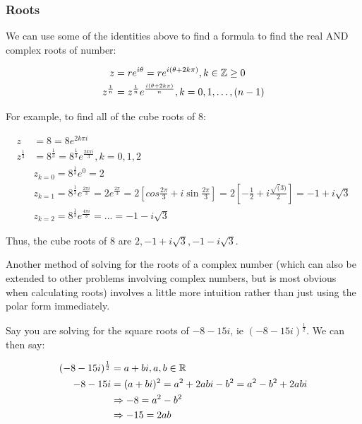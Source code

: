 \documentclass[12pt]{article}
\begin{document}
\subsubsection{Roots}

We can use some of the identities above to find a formula to find the real AND complex roots of number:

\begin{equation}
    \begin{split}
        z &= r e^{i \theta} = re^{i(\theta +2k\pi)}, k \in \mathbb{Z} \ge 0\\
        z^{\frac{1}{n}} &= z^{\frac{1}{n}}e^{\frac{i (\theta + 2k\pi)}{n}}, k = 0,1,\dots,(n-1)\\
    \end{split}
\end{equation}

For example, to find all of the cube roots of 8:

\begin{equation}
    \begin{split}
        z &= 8 = 8e^{2k\pi i}\\
        z^{\frac{1}{3}} &= 8^{\frac{1}{3}} = 8^{\frac{1}{3}}e^{\frac{2k\pi i}{3}}, k = 0,1,2\\
        &z_{k=0} = 8^{\frac{1}{3}}e^{0} = 2\\
        &z_{k=1} = 8^{\frac{1}{3}}e^{\frac{2\pi i}{3}} = 2e^{\frac{2\pi}{3}}=2[cos\frac{2\pi}{3}+i\sin\frac{2\pi}{3}] = 2[-\frac{1}{2}+i\frac{\sqrt(3)}{2}] = -1 + i \sqrt{3}\\
        &z_{k=2} = 8^{\frac{1}{3}}e^{\frac{4\pi i}{3}} = ... = -1 - i \sqrt{3}
    \end{split}
\end{equation}

Thus, the cube roots of 8 are $2, -1 + i\sqrt{3}, -1 - i\sqrt{3}$.

Another method of solving for the roots of a complex number (which can also be extended to other problems involving complex numbers, but is most obvious when calculating roots) involves a little more intuition rather than just using the polar form immediately. 

Say you are solving for the square roots of $-8-15i$, ie $(-8-15i)^\frac{1}{2}$. We can then say:

\begin{equation}
    \begin{split}
        (-8-15i)^\frac{1}{2} &= a + bi, a, b\in \mathbb{R}\\
        -8-15i &= (a + bi)^2 = a^2+2abi-b^2 = a^2-b^2+2abi\\
        &\Rightarrow-8 = a^2-b^2\\
        &\Rightarrow-15 = 2ab\\
    \end{split}
\end{equation}
\end{document}
